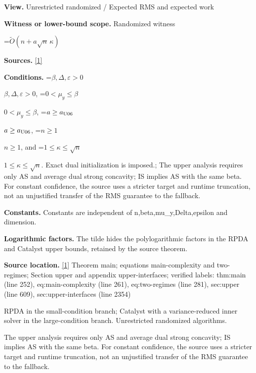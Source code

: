 \documentclass[10pt,a4paper]{article}
\newcommand{\AtlasMath}[1]{\par\begingroup\centering\setbox0=\hbox{$\displaystyle #1$}\ifdim\wd0>1.4\linewidth\typeout{ATLAS WIDE FORMULA: \the\wd0}\fi\ifdim\wd0>\linewidth\resizebox{\linewidth}{!}{\box0}\else\box0\fi\par\endgroup}
\newcommand{\AtlasInlineMath}[1]{\begingroup\setbox0=\hbox{$#1$}\ifdim\wd0>.4\linewidth\endgroup\AtlasMath{#1}\else\endgroup$#1$\fi}
\begin{document}
\textbf{View.} Unrestricted randomized / Expected RMS and expected work



\textbf{Witness or lower-bound scope.} Randomized witness



\AtlasMath{\widetilde O(n+a\sqrt n\,\kappa)}


\textbf{Sources.} \href{https://github.com/WU-Wendao/Colombo/blob/main/colombo_sensorium/Complexity_altas/data/sources/colombo/U06/manuscript.pdf}{[1]}



\textbf{Conditions.} \AtlasInlineMath{\beta,\Delta,\varepsilon>0}, \AtlasInlineMath{0<\mu_y\le\beta}, \AtlasInlineMath{a\ge a_{\rm U06}}, \AtlasInlineMath{n\ge1}, and \AtlasInlineMath{1\le\kappa\le\sqrt n}. Exact dual initialization is imposed.; The upper analysis requires only AS and average dual strong concavity; IS implies AS with the same beta. For constant confidence, the source uses a stricter target and runtime truncation, not an unjustified transfer of the RMS guarantee to the fallback.



\textbf{Constants.} Constants are independent of n,beta,mu\_y,Delta,epsilon and dimension.



\textbf{Logarithmic factors.} The tilde hides the polylogarithmic factors in the RPDA and Catalyst upper bounds, retained by the source theorem.



\textbf{Source location.} \href{https://github.com/WU-Wendao/Colombo/blob/main/colombo_sensorium/Complexity_altas/data/sources/colombo/U06/manuscript.pdf}{[1]} Theorem main; equations main-complexity and two-regimes; Section upper and appendix upper-interfaces; verified labels: thm:main (line 252), eq:main-complexity (line 261), eq:two-regimes (line 281), sec:upper (line 609), sec:upper-interfaces (line 2354)



RPDA in the small-condition branch; Catalyst with a variance-reduced inner solver in the large-condition branch. Unrestricted randomized algorithms.



The upper analysis requires only AS and average dual strong concavity; IS implies AS with the same beta. For constant confidence, the source uses a stricter target and runtime truncation, not an unjustified transfer of the RMS guarantee to the fallback.
\end{document}
